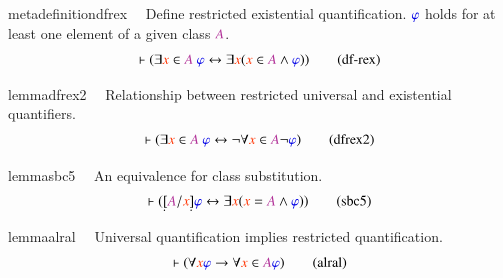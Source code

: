 \begin{restatable}{metadefinition}{dfrex}~~ Define restricted existential
quantification.   $\mw{\varphi}$
holds for
     at least one element of a given class $\mc{A}$.  
\begin{align}
\vdash ( \exists \msc{x} \in \mc{A}~\mw{\varphi} \leftrightarrow \exists
    \msc{x} ( \msc{x} \in \mc{A} \wedge \mw{\varphi} )
    )\label{eq:df-rex}\tag{df-rex}
\end{align}
\end{restatable}

\begin{restatable}{lemma}{dfrex2}~~ Relationship between restricted universal
and existential quantifiers.
     ~  ~
\begin{align}
\vdash ( \exists \msc{x} \in \mc{A}~\mw{\varphi} \leftrightarrow \lnot \forall
    \msc{x} \in \mc{A} \lnot \mw{\varphi} )\label{eq:dfrex2}\tag{dfrex2}
\end{align}
\end{restatable}

\begin{restatable}{lemma}{sbc5}~~ An equivalence for class substitution. 
~  ~
\begin{align}
\vdash ( \underaccent{\dot}{[} \mc{A} / \msc{x} \underaccent{\dot}{]}
    \mw{\varphi} \leftrightarrow \exists \msc{x} ( \msc{x} = \mc{A} \wedge
    \mw{\varphi} ) )\label{eq:sbc5}\tag{sbc5}
\end{align}
\end{restatable}

\dfss

\begin{restatable}{lemma}{alral}~~ Universal quantification implies restricted
quantification. 
\begin{align}
\vdash ( \forall \msc{x} \mw{\varphi} \rightarrow \forall \msc{x} \in \mc{A}
    \mw{\varphi} )\label{eq:alral}\tag{alral}
\end{align}
\end{restatable}

